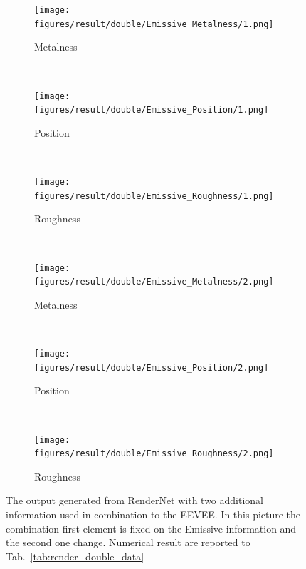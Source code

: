\begin{figure}[h!]
    \centering
    \begin{subfigure}[b]{0.175\textwidth}
     \texttt{[image: figures/result/double/Emissive\_Metalness/1.png]}
     \caption{Metalness}\label{subfig:1}
    \end{subfigure}
    ~
    \begin{subfigure}[b]{0.175\textwidth}
     \texttt{[image: figures/result/double/Emissive\_Position/1.png]}
     \caption{Position}
    \end{subfigure}
    ~
    \begin{subfigure}[b]{0.175\textwidth}
     \texttt{[image: figures/result/double/Emissive\_Roughness/1.png]}
     \caption{Roughness}
    \end{subfigure}
    \\ \vspace{0.2cm} %
    \begin{subfigure}[b]{0.175\textwidth}
     \texttt{[image: figures/result/double/Emissive\_Metalness/2.png]}
     \caption{Metalness}\label{subfig:1}
    \end{subfigure}
    ~
    \begin{subfigure}[b]{0.175\textwidth}
     \texttt{[image: figures/result/double/Emissive\_Position/2.png]}
     \caption{Position}
    \end{subfigure}
    ~
    \begin{subfigure}[b]{0.175\textwidth}
     \texttt{[image: figures/result/double/Emissive\_Roughness/2.png]}
     \caption{Roughness}
    \end{subfigure}
    \caption{The output generated from RenderNet with two additional information used in combination to the EEVEE. In this picture the combination first element is fixed on the Emissive information and the second one change. Numerical result are reported to Tab.~\ref{tab:render_double_data}}
    \label{fig:double_input_base_emissive_generation}
\end{figure}

